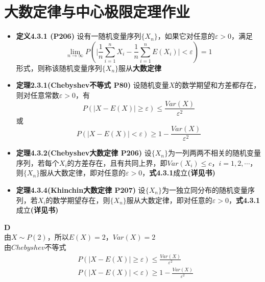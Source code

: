 \documentclass[a4paper]{ctexart}    %
\begin{document}
	\section{大数定律与中心极限定理作业}
	\begin{tcolorbox}
		[colframe=blue!25,
		colback=blue!10,
		coltitle=blue!20!black,  
		fonttitle=\bfseries,
		adjusted title=Formula Or Theorem:
		]
		\begin{itemize}
			\item \textbf{定义4.3.1 (P206)} 设有一随机变量序列$ \{X_n\} $，如果它对任意的$ \varepsilon > 0 $，满足
			\begin{equation}
				\lim\limits_{n \to \infty}P\left(\bigg|\frac{1}{n}\sum\limits_{i=1}^{n}X_i-\frac{1}{n}\sum\limits_{i=1}^nE(X_i)\bigg| < \varepsilon\right) = 1\tag{4.3.1}
			\end{equation}
			形式，则称该随机变量序列$ \{X_n\} $服从\textbf{大数定律}
			\item \textbf{定理2.3.1(Chebyshev不等式 P80)} 设随机变量$ X $的数学期望和方差都存在，则对任意常数$ \varepsilon > 0 $，有
			\begin{equation*}
				P(|X - E(X)| \geq \varepsilon) \leq \frac{Var(X)}{\varepsilon^2}
			\end{equation*}
			或
			\begin{equation*}
				P(|X-E(X)| < \varepsilon) \geq 1-\frac{Var(X)}{\varepsilon^2}
			\end{equation*}
			\item \textbf{定理4.3.2(Chebyshev大数定律 P206)} 设$ \{X_n\} $为一列两两不相关的随机变量序列，若每个$ X_i $的方差存在，且有共同上界，即$ Var(X_i) \leq c\text{，} i=1, 2, \cdots $，则$ \{X_n\} $服从大数定律，即对任意的$ \varepsilon > 0 $，\textbf{式4.3.1}成立\textbf{(详见书)}
			\item \textbf{定理4.3.4(Khinchin大数定律 P207)} 设$ \{X_n\} $为一独立同分布的随机变量序列，若$ X_i $的数学期望存在，则$ \{X_n\} $服从大数定律，即对任意的$ \varepsilon > 0 $，\textbf{式4.3.1}成立\textbf{(详见书)}
		\end{itemize}
	\end{tcolorbox}
	 \quad\textbf{D} \\
	由$X\sim P(2)$，所以$E(X)=2$，$Var(X)=2$\\
	由$Chebyshev$不等式
	\begin{equation*}
		\begin{split}
			&P\left(\left|X-E(X)\right|\geq \varepsilon \right) \leq \frac{Var(X)}{\varepsilon^2}\\
			&P\left(\left|X-E(X)\right|< \varepsilon\right) \geq 1 - \frac{Var(X)}{\varepsilon^2}
		\end{split}
	\end{equation*}
\end{document}
